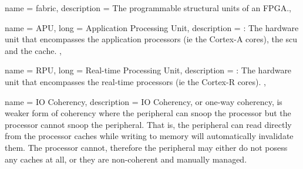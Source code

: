 {
	name = {fabric},
	description = {The programmable structural units of an FPGA.},
}

{
	name = {APU},
	long = {Application Processing Unit},
	description = {\emph{}:
		The hardware unit that encompasses the application processors (ie the Cortex-A cores),
		the \gls{scu} and the cache.
	},
}

{
	name = {RPU},
	long = {Real-time Processing Unit},
	description = {\emph{}:
		The hardware unit that encompasses the real-time processors (ie the Cortex-R cores).
	},
}


{
	name = {IO Coherency},
	description = {
		IO Coherency, or one-way coherency, is weaker form of coherency where
		the peripheral can snoop the processor but the processor cannot snoop the peripheral.
		That is, the peripheral can read directly from the processor caches while
		writing to memory will automatically invalidate them. The processor cannot,
		therefore the peripheral may either do not posess any caches at all, or they
		are non-coherent and manually managed.
	}
}

